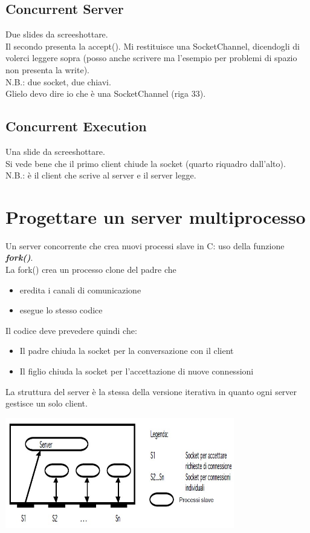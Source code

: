 \subsection{Concurrent Server}
Due slides da screeshottare.
\\Il secondo presenta la accept(). Mi restituisce una SocketChannel, dicendogli di volerci leggere sopra (posso anche scrivere ma l'esempio per problemi di spazio non presenta la write).
\\N.B.: due socket, due chiavi.
\\Glielo devo dire io che è una SocketChannel (riga 33).

\subsection{Concurrent Execution}
Una slide da screeshottare.
\\Si vede bene che il primo client chiude la socket (quarto riquadro dall'alto).
\\N.B.: è il client che scrive al server e il server legge.

\section{Progettare un server multiprocesso}
Un server concorrente che crea nuovi processi slave in C: uso della funzione \textbf{\textit{fork()}}.
\\La fork() crea un processo clone del padre che
\begin{itemize}
    \item eredita i canali di comunicazione
    \item esegue lo stesso codice
\end{itemize}
Il codice deve prevedere quindi che: 
\begin{itemize}
    \item Il padre chiuda la socket per la conversazione con il client
    \item Il figlio chiuda la socket per l'accettazione di nuove connessioni
\end{itemize}
La struttura del server è la stessa della versione iterativa in quanto ogni server gestisce un solo client.
\begin{center}
    \includegraphics[width=0.75\textwidth]{img/serverMultiprocesso1.jpg}
\end{center}

